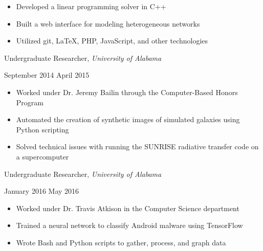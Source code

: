 \documentclass[11pt]{article}
\begin{document}
\begin{itemize}
  \item Developed a linear programming solver in C++
  \item Built a web interface for modeling heterogeneous networks
  \item Utilized git, \LaTeX, PHP, JavaScript, and other technologies
\end{itemize}

\vspace{0.4em}
\begin{minipage}[t]{0.65\textwidth}
\flushleft
Undergraduate Researcher, \textit{University of Alabama}\\
\end{minipage}
\begin{minipage}[t]{0.3\textwidth}
\flushright
September 2014 \space \textemdash \space April 2015\\
\end{minipage}

\begin{itemize}
  \item Worked under Dr. Jeremy Bailin through the Computer-Based Honors Program
  \item Automated the creation of synthetic images of simulated galaxies using Python scripting
  \item Solved technical issues with running the SUNRISE radiative transfer code on a supercomputer
\end{itemize}

\vspace{0.4em}
\begin{minipage}[t]{0.65\textwidth}
\flushleft
Undergraduate Researcher, \textit{University of Alabama}\\
\end{minipage}
\begin{minipage}[t]{0.3\textwidth}
\flushright
January 2016 \space \textemdash \space May 2016\\
\end{minipage}

\begin{itemize}
  \item Worked under Dr. Travis Atkison in the Computer Science department
  \item Trained a neural network to classify Android malware using TensorFlow
  \item Wrote Bash and Python scripts to gather, process, and graph data
\end{itemize}
\end{document}
